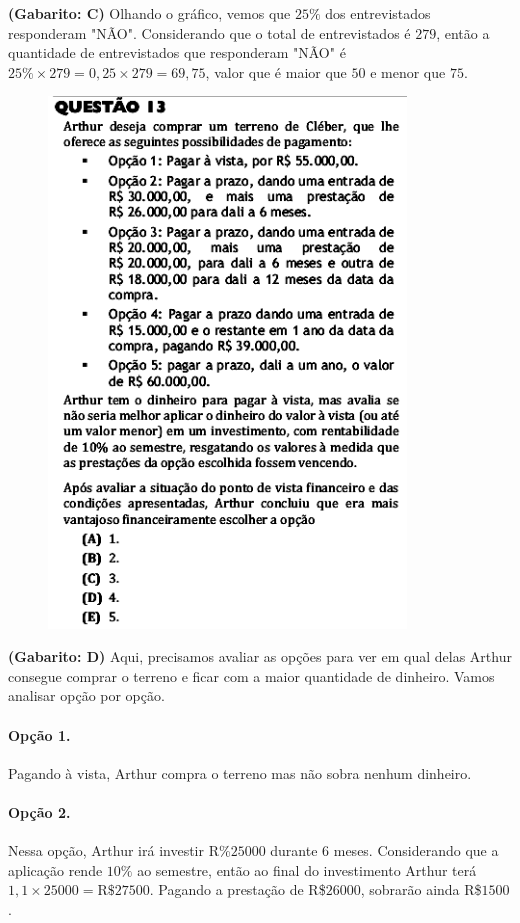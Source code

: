 \documentclass[a4paper]{article}
\begin{document}
\par\textbf{(Gabarito: C)} Olhando o gráfico, vemos que $25\%$ dos entrevistados responderam "NÃO". Considerando que o total de entrevistados é $279$, então a quantidade de entrevistados que responderam "NÃO" é $25\%\times 279 = 0,25\times 279 = 69,75$, valor que é maior que $50$ e menor que $75$.
\begin{figure}[H]
	\begin{center}
		\includegraphics[width=9.5cm]{L3Q13.png}
	\end{center}
\end{figure}
\par\textbf{(Gabarito: D)} Aqui, precisamos avaliar as opções para ver em qual delas Arthur consegue comprar o terreno e ficar com a maior quantidade de dinheiro. Vamos analisar opção por opção.
\paragraph{Opção 1.} Pagando à vista, Arthur compra o terreno mas não sobra nenhum dinheiro.
\paragraph{Opção 2.} Nessa opção, Arthur irá investir R\%$25000$ durante $6$ meses. Considerando que a aplicação rende $10\%$ ao semestre, então ao final do investimento Arthur terá $1,1\times 25000 = \text{R\$}27500$. Pagando a prestação de R\$$26000$, sobrarão ainda R\$$1500$.
\end{document}

